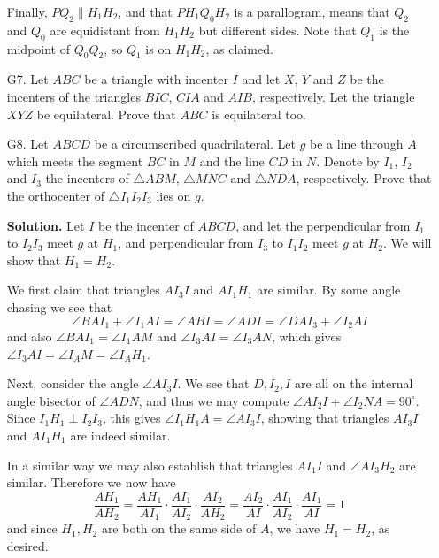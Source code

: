 \documentclass[11pt,a4paper]{article}
\begin{document}
\begin{enumerate}
    	Finally, $PQ_2\parallel H_1H_2$, 
    	and that $PH_1Q_0H_2$ is a parallogram,
    	means that $Q_2$ and $Q_0$ are equidistant from $H_1H_2$ but different sides. 
    	Note that $Q_1$ is the midpoint of $Q_0Q_2$, 
    	so $Q_1$ is on $H_1H_2$, as claimed. 
    	
    	\item [G7.]
    	Let $ABC$ be a triangle with incenter $I$ and let $X$, $Y$ and $Z$ be the incenters of the triangles $BIC$, $CIA$ and $AIB$, respectively. Let the triangle $XYZ$ be equilateral. Prove that $ABC$ is equilateral too.
    	
    	
    	\item [G8.]
    	Let $ABCD$ be a circumscribed quadrilateral. Let $g$ be a line through $A$ which meets the segment $BC$ in $M$ and the line $CD$ in $N$. Denote by $I_1$, $I_2$ and $I_3$ the incenters of $\triangle ABM$, $\triangle MNC$ and $\triangle NDA$, respectively. Prove that the orthocenter of $\triangle I_1I_2I_3$ lies on $g$.
    	
    	\textbf{Solution.} 
    	Let $I$ be the incenter of $ABCD$, and let the perpendicular from $I_1$ to $I_2I_3$ meet $g$ at $H_1$, 
    	and perpendicular from $I_3$ to $I_1I_2$ meet $g$ at $H_2$. 
    	We will show that $H_1=H_2$. 
    	
    	We first claim that triangles $AI_3I $ and $AI_1H_1$ are similar. 
    	By some angle chasing we see that 
    	\[
    	\angle BAI_1 + \angle I_1AI = \angle ABI = \angle ADI = \angle DAI_3 + \angle I_2AI
    	\]
    	and also $\angle BAI_1 = \angle I_1AM$ and $\angle I_3AI = \angle I_3AN$, 
    	which gives $\angle I_3AI =\angle I_AM = \angle I_AH_1$. 
    	
    	Next, consider the angle $\angle AI_3I$. 
    	We see that $D, I_2, I$ are all on the internal angle bisector of $\angle ADN$, 
    	and thus we may compute $\angle AI_2I + \angle I_2NA=90^{\circ}$. 
    	Since $I_1H_1\perp I_2I_3$, 
    	this gives $\angle I_1H_1A = \angle AI_3I$, 
    	showing that triangles $AI_3I$ and $AI_1H_1$ are indeed similar. 
    	
    	In a similar way we may also establish that triangles $AI_1I$ and $\angle AI_3H_2$ are similar. 
    	Therefore we now have 
    	\[
    	\frac{AH_1}{AH_2}
    	=\frac{AH_1}{AI_1}\cdot \frac{AI_1}{AI_2}\cdot \frac{AI_2}{AH_2}
    	=\frac{AI_2}{AI}\cdot \frac{AI_1}{AI_2}\cdot \frac{AI_1}{AI}
    	=1
    	\]
    	and since $H_1, H_2$ are both on the same side of $A$, we have $H_1=H_2$, as desired. 
    	
    \end{enumerate}
    
\end{document}

